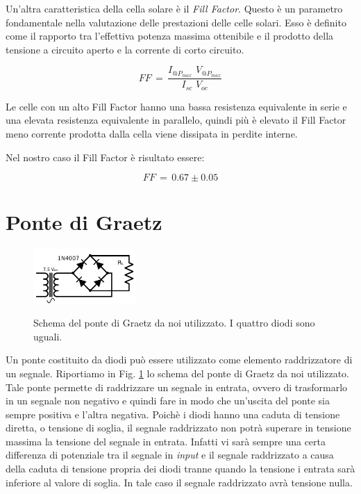 Un'altra caratteristica della cella solare è il \emph{Fill Factor}. Questo è un parametro fondamentale nella valutazione delle prestazioni delle celle solari. Esso è definito come il rapporto tra l'effettiva potenza massima ottenibile e il prodotto della tensione a circuito aperto e la corrente di corto circuito.

\begin{equation}
FF \, = \, \frac{I_{@P_{max}} \,\, V_{@P_{max}}}{I_{sc} \,\, V_{oc}}
\label{eq:FF}
\end{equation}

Le celle con un alto Fill Factor hanno una bassa resistenza equivalente in serie e una elevata resistenza equivalente in parallelo, quindi più è elevato il Fill Factor meno corrente prodotta dalla cella viene dissipata in perdite interne.

Nel nostro caso il Fill Factor è risultato essere:

$$FF \,=\, 0.67 \pm 0.05$$
\section{Ponte di Graetz}

\begin{figure}
	\caption{Schema del ponte di Graetz da noi utilizzato. I quattro diodi sono uguali.}
	\includegraphics[width=0.35\textwidth]{schema_graetz.pdf}
	\label{fig:graetz}
\end{figure}

Un ponte costituito da diodi può essere utilizzato come elemento raddrizzatore di un segnale. Riportiamo in Fig. \ref{fig:graetz} lo schema del ponte di Graetz da noi utilizzato. Tale ponte permette di raddrizzare un segnale in entrata, ovvero di trasformarlo in un segnale non negativo e quindi fare in modo che un'uscita del ponte sia sempre positiva e l'altra negativa. Poichè i diodi hanno una caduta di tensione diretta, o tensione di soglia, il segnale raddrizzato non potrà superare in tensione massima la tensione del segnale in entrata. Infatti vi sarà sempre una certa differenza di potenziale tra il segnale in \emph{input} e il segnale raddrizzato a causa della caduta di tensione propria dei diodi tranne quando la tensione i entrata sarà inferiore al valore di soglia. In tale caso il segnale raddrizzato avrà tensione nulla.

